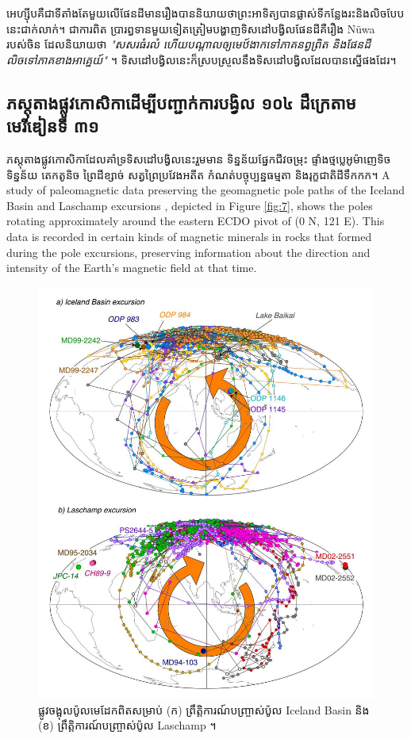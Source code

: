\documentclass[10pt,twocolumn,letterpaper]{article}
\begin{document}
អេហ្ស៊ីបគឺជាទីតាំងតែមួយលើផែនដីមានរឿងបាននិយាយថាព្រះអាទិត្យបានផ្លាស់ទីកន្លែងរះនិងលិចបែបនេះជាក់លាក់។ ជាការពិត ប្រារព្ធទានមួយទៀតត្រៀមបង្ហាញទិសដៅបង្វិលផែនដីគឺរឿង Nüwa របស់ចិន ដែលនិយាយថា \textit{"សសរធំរលំ ហើយបណ្ដាលឲ្យមេឋ៍ងាកទៅភាគនព្វព្រិត និងផែនដីលិចទៅភាគខាងអាគ្នេយ៍"} \cite{8}។ ទិសដៅបង្វិលនេះក៏ស្របស្រួលនឹងទិសដៅបង្វិលដែលបានស្នើផងដែរ។

\subsection{ភស្តុតាងផ្លូវកោសិកាដើម្បីបញ្ជាក់ការបង្វិល ១០៤ ដឺក្រេតាមមេរីឌៀនទី ៣១}

ភស្តុតាងផ្លូវកោសិកាដែលគាំទ្រទិសដៅបង្វិលនេះរួមមាន ទិន្នន័យផ្នែកជីវចម្រុះ ផ្ទាំងថ្មប្លេអូម៉ាញេទិច ទិន្នន័យ តេកតូនិច ព្រៃដីខ្សាច់ សត្វព្រៃប្រវែងអតីត កំណត់បច្ចុប្បន្នធម្មតា និងរុក្ខជាតិដីទឹកកក។
A study of paleomagnetic data preserving the geomagnetic pole paths of the Iceland Basin and Laschamp excursions \cite{35}, depicted in Figure \ref{fig:7}, shows the poles rotating approximately around the eastern ECDO pivot of (0 N, 121 E). This data is recorded in certain kinds of magnetic minerals in rocks that formed during the pole excursions, preserving information about the direction and intensity of the Earth's magnetic field at that time.

\begin{figure}[t]
\begin{center}
   \includegraphics[width=0.95\linewidth]{laj.jpg}
\end{center}
   \caption{ផ្លូវចង្អុលប៉ូលមេដែកពិតសម្រាប់ (ក) ព្រឹត្តិការណ៍បញ្ច្រាស់ប៉ូល Iceland Basin និង (ខ) ព្រឹត្តិការណ៍បញ្ច្រាស់ប៉ូល Laschamp \cite{35}។}
\label{fig:7}
\label{fig:onecol}
\end{figure}
\end{document}
